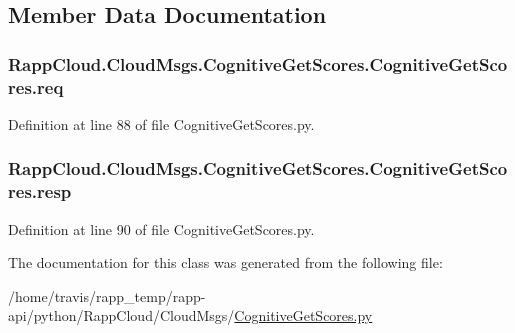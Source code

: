 \subsection{Member Data Documentation}
\hypertarget{classRappCloud_1_1CloudMsgs_1_1CognitiveGetScores_1_1CognitiveGetScores_a0e52891359faef994878cc62e7d835ba}{
\subsubsection[{req}]{\setlength{\rightskip}{0pt plus 5cm}Rapp\-Cloud.\-Cloud\-Msgs.\-Cognitive\-Get\-Scores.\-Cognitive\-Get\-Scores.\-req}}\label{classRappCloud_1_1CloudMsgs_1_1CognitiveGetScores_1_1CognitiveGetScores_a0e52891359faef994878cc62e7d835ba}


Definition at line 88 of file Cognitive\-Get\-Scores.\-py.

\hypertarget{classRappCloud_1_1CloudMsgs_1_1CognitiveGetScores_1_1CognitiveGetScores_a906289c82bbcf58174e51b2b927ee76f}{
\subsubsection[{resp}]{\setlength{\rightskip}{0pt plus 5cm}Rapp\-Cloud.\-Cloud\-Msgs.\-Cognitive\-Get\-Scores.\-Cognitive\-Get\-Scores.\-resp}}\label{classRappCloud_1_1CloudMsgs_1_1CognitiveGetScores_1_1CognitiveGetScores_a906289c82bbcf58174e51b2b927ee76f}


Definition at line 90 of file Cognitive\-Get\-Scores.\-py.



The documentation for this class was generated from the following file\-:\begin{DoxyCompactItemize}
\item 
/home/travis/rapp\-\_\-temp/rapp-\/api/python/\-Rapp\-Cloud/\-Cloud\-Msgs/\hyperlink{CognitiveGetScores_8py}{Cognitive\-Get\-Scores.\-py}\end{DoxyCompactItemize}
